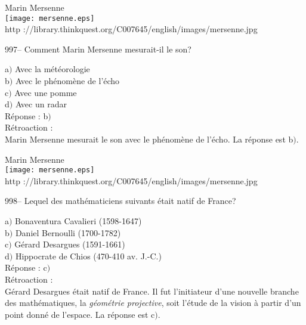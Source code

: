 ﻿\documentclass[letterpaper, 12pt]{article}
\begin{document}
        \begin{center}
        Marin Mersenne\\
    \texttt{[image: mersenne.eps]}\\
        {\footnotesize http
://library.thinkquest.org/C007645/english/images/mersenne.jpg}
    \end{center}

997-- Comment Marin Mersenne mesurait-il le son?

a$)$ Avec la m\'et\'eorologie \\
b$)$ Avec le ph\'enom\`ene de l'\'echo \\
c$)$ Avec une pomme \\
d$)$ Avec un radar\\

R\'eponse : b$)$\\

R\'etroaction : \\
Marin Mersenne mesurait le son avec le ph\'enom\`ene de l'\'echo.
La r\'eponse est b$)$.\\

        \begin{center}
        Marin Mersenne\\
    \texttt{[image: mersenne.eps]}\\
        {\footnotesize http
://library.thinkquest.org/C007645/english/images/mersenne.jpg}
    \end{center}

998-- Lequel des math\'ematiciens suivants \'etait natif de France?

a$)$ Bonaventura Cavalieri (1598-1647) \\
b$)$ Daniel Bernoulli (1700-1782) \\
c$)$ G\'erard Desargues (1591-1661) \\
d$)$ Hippocrate de Chios (470-410 av. J.-C.)\\

R\'eponse : c$)$\\

R\'etroaction : \\
G\'erard Desargues \'etait natif de France. Il fut l'initiateur
d'une nouvelle branche des math\'ematiques, la {\sl g\'eom\'etrie
projective}, soit l'\'etude de la vision \`a partir d'un point
donn\'e de l'espace.
La r\'eponse est c$)$.\\

\end{document}
